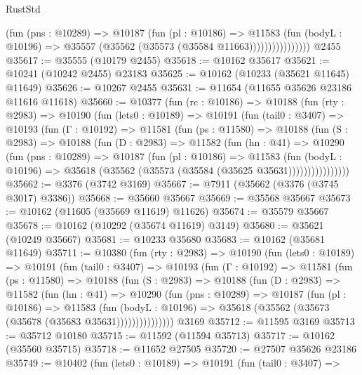\begin{lexlean}{RustStd}
\begin{coremodule}
                        (fun (pns : @10289) =>
                        @10187
                          (fun (pl : @10186) =>
                          @11583
                            (fun (bodyL : @10196) =>
                            @35557 (@35562 (@35573 (@35584 @11663))))))))))))))))
    @2455
@35617 := @35555 (@10179 @2455)
@35618 := @10162 @35617
@35621 := @10241 (@10242 @2455) @23183
@35625 := @10162 (@10233 (@35621 @11645) @11649)
@35626 := @10267 @2455
@35631 := @11654 (@11655 @35626 @23186 @11616 @11618)
@35660 := @10377
    (fun (rc : @10186) =>
    @10188
      (fun (rty : @2983) =>
      @10190
        (fun (lets0 : @10189) =>
        @10191
          (fun (tail0 : @3407) =>
          @10193
            (fun (Γ : @10192) =>
            @11581
              (fun (ps : @11580) =>
              @10188
                (fun (S : @2983) =>
                @10188
                  (fun (D : @2983) =>
                  @11582
                    (fun (hn : @41) =>
                    @10290
                      (fun (pns : @10289) =>
                      @10187
                        (fun (pl : @10186) =>
                        @11583
                          (fun (bodyL : @10196) =>
                          @35618 (@35562 (@35573 (@35584 (@35625 @35631))))))))))))))))
@35662 := @3376 (@3742 @3169)
@35667 := @7911 (@35662 (@3376 (@3745 @3017) @3386))
@35668 := @35660 @35667
@35669 := @35568 @35667
@35673 := @10162 (@11605 (@35669 @11619) @11626)
@35674 := @35579 @35667
@35678 := @10162 (@10292 (@35674 @11619) @3149)
@35680 := @35621 (@10249 @35667)
@35681 := @10233 @35680
@35683 := @10162 (@35681 @11649)
@35711 := @10380
    (fun (rty : @2983) =>
    @10190
      (fun (lets0 : @10189) =>
      @10191
        (fun (tail0 : @3407) =>
        @10193
          (fun (Γ : @10192) =>
          @11581
            (fun (ps : @11580) =>
            @10188
              (fun (S : @2983) =>
              @10188
                (fun (D : @2983) =>
                @11582
                  (fun (hn : @41) =>
                  @10290
                    (fun (pns : @10289) =>
                    @10187
                      (fun (pl : @10186) =>
                      @11583
                        (fun (bodyL : @10196) =>
                        @35618 (@35562 (@35673 (@35678 (@35683 @35631)))))))))))))))
    @3169
@35712 := @11595 @3169
@35713 := @35712 @10180
@35715 := @11592 (@11594 @35713)
@35717 := @10162 (@35560 @35715)
@35718 := @11652 @27505
@35720 := @27507 @35626 @23186
@35749 := @10402
    (fun (lets0 : @10189) =>
    @10191
      (fun (tail0 : @3407) =>

\end{coremodule}
\end{lexlean}
